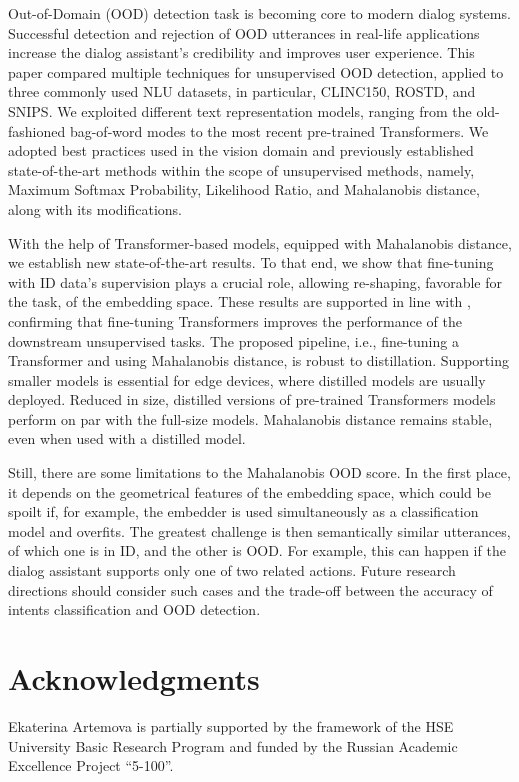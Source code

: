 \documentclass[letterpaper, final]{article} %
\begin{document}
Out-of-Domain (OOD) detection task is becoming core to modern dialog systems. Successful detection and rejection of OOD utterances in real-life applications increase the dialog assistant's credibility and improves user experience. This paper compared multiple techniques for unsupervised OOD detection, applied to three commonly used NLU datasets, in particular, CLINC150, ROSTD, and SNIPS. We exploited different text representation models, ranging from the old-fashioned bag-of-word modes to the most recent pre-trained Transformers. We adopted best practices used in the vision domain and previously established state-of-the-art methods within the scope of unsupervised methods, namely, Maximum Softmax Probability, Likelihood Ratio, and Mahalanobis distance, along with its modifications.

With the help of Transformer-based models, equipped with Mahalanobis distance, we establish new state-of-the-art results. To that end, we show that fine-tuning with ID data's supervision plays a crucial role, allowing re-shaping, favorable for the task, of the embedding space. These results are supported in line with \cite{reimers2019sentence}, confirming that fine-tuning Transformers improves the performance of the downstream unsupervised tasks. The proposed pipeline, i.e., fine-tuning a Transformer and using Mahalanobis distance, is robust to distillation. Supporting smaller models is essential for edge devices, where distilled models are usually deployed. Reduced in size, distilled versions of pre-trained Transformers models perform on par with the full-size models. Mahalanobis distance remains stable, even when used with a distilled model.

Still, there are some limitations to the Mahalanobis OOD score. In the first place, it depends on the geometrical features of the embedding space, which could be spoilt if, for example, the embedder is used simultaneously as a classification model and overfits. The greatest challenge is then semantically similar utterances, of which one is in ID, and the other is OOD. For example, this can happen if the dialog assistant supports only one of two related actions. Future research directions should consider such cases and the trade-off between the accuracy of intents classification and OOD detection.


\section*{Acknowledgments}
Ekaterina Artemova is partially supported by the framework of the HSE University Basic Research Program and funded by the Russian Academic Excellence Project  ``5-100''.
\end{document}
